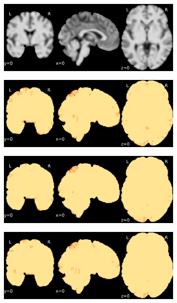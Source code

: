 \documentclass{article}
\begin{document}
\begin{landscape}
\begin{figure}
        \begin{subfigure}[t]{0.2\paperheight}
            \centering
            \includegraphics[width=\textwidth]{figures/ieee_T1/fwhm_5/ieee_ds002338_sub-xp207.pdf}
        \end{subfigure}
        \begin{subfigure}[t]{0.2\paperheight}
            \centering
            \includegraphics[width=\textwidth]{figures/sig/fwhm_5/rr_ds002338_sub-xp207_sig.pdf}
        \end{subfigure}
        \begin{subfigure}[t]{0.2\paperheight}
            \centering
            \includegraphics[width=\textwidth]{figures/sig/fwhm_5/rs_ds002338_sub-xp207_sig.pdf}
        \end{subfigure}
        \begin{subfigure}[t]{0.2\paperheight}
            \centering
            \includegraphics[width=\textwidth]{figures/sig/fwhm_5/rr.rs_ds002338_sub-xp207_sig.pdf}

\end{subfigure}
\end{figure}
\end{landscape}
\end{document}
